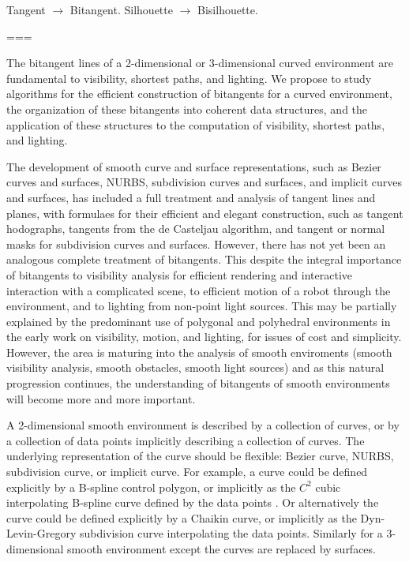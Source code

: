 \documentclass[11pt]{article}
\begin{document}
Tangent $\rightarrow$ Bitangent.
Silhouette $\rightarrow$ Bisilhouette.

===

The bitangent lines of a 2-dimensional or 3-dimensional curved environment
are fundamental to visibility, shortest paths, and lighting.
We propose to study algorithms for the efficient construction of bitangents
for a curved environment, the organization of these bitangents into coherent
data structures, and the application of these structures to the computation
of visibility, shortest paths, and lighting.

The development of smooth curve and surface representations, such as Bezier 
curves and surfaces, NURBS, subdivision curves and surfaces, and implicit curves
and surfaces, has included a full treatment and analysis of tangent lines
and planes, with formulaes for their efficient and elegant construction,
such as tangent hodographs, tangents from the de Casteljau algorithm, and
tangent or normal masks for subdivision curves and surfaces.
However, there has not yet been an analogous complete treatment of bitangents.
This despite the integral importance of bitangents to visibility analysis
for efficient rendering and interactive interaction with a complicated scene,
to efficient motion of a robot through the environment, and to lighting from
non-point light sources.
This may be partially explained by the predominant use of polygonal and polyhedral 
environments in the early work on visibility, motion, and lighting,
for issues of cost and simplicity.
However, the area is maturing into the analysis of smooth enviroments
(smooth visibility analysis, smooth obstacles, smooth light sources)
and as this natural progression continues,
the understanding of bitangents of smooth environments will become
more and more important.

A 2-dimensional smooth environment is described by a collection of curves,
or by a collection of data points implicitly describing a collection of curves.
The underlying representation of the curve should be flexible:
Bezier curve, NURBS, subdivision curve, or implicit curve.
For example, a curve could be defined explicitly by a B-spline control polygon,
or implicitly as the $C^2$ cubic interpolating B-spline curve defined by 
the data points \cite{farintext}.
Or alternatively the curve could be defined explicitly by a Chaikin curve,
or implicitly as the Dyn-Levin-Gregory subdivision curve interpolating the
data points.
Similarly for a 3-dimensional smooth environment except the curves are replaced
by surfaces.
\end{document}
